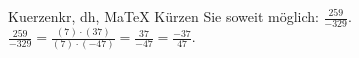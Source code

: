 \begin{MAufgabe}{Kuerzen}{kr, dh, MaTeX}
K\"urzen Sie soweit m\"oglich: $\frac{259}{-329}$.\\ 
\ifLsg\MLoesung
\quad $\frac{259}{-329}=\frac{(7)\cdot(37)}{(7)\cdot(-47)}=\frac{37}{-47}=\frac{-37}{47}$.\else\relax\fi
 \end{MAufgabe}